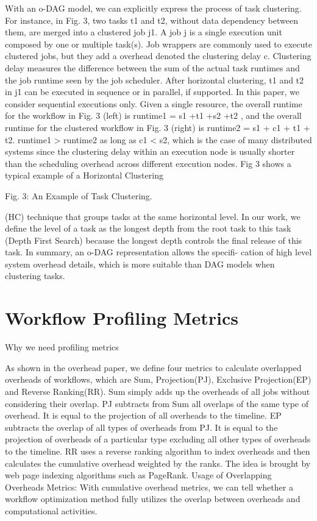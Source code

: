 \documentclass[final,5p,times,twocolumn]{elsarticle}
\begin{document}
With an o-DAG model, we can explicitly express the process of task clustering. For instance, in Fig. 3, two tasks t1 and t2, without data dependency between them, are merged into a clustered job j1. A job j is a single execution unit composed by one or multiple task(s). Job wrappers are commonly used to execute clustered jobs, but they add a overhead denoted the clustering delay c. Clustering delay measures the difference between the sum of the actual task runtimes and the job runtime seen by the job scheduler. After horizontal clustering, t1 and t2 in j1 can be executed in sequence or in parallel, if supported. In this paper, we consider sequential executions only. Given a single resource, the overall runtime for the workflow in Fig. 3 (left) is runtime1 = s1 +t1 +s2 +t2 , and the overall runtime for the clustered workflow in Fig. 3 (right) is runtime2 = s1 + c1 + t1 + t2. runtime1 > runtime2 as long as c1 < s2, which is the case of many distributed systems since the clustering delay within an execution node is usually shorter than the scheduling overhead across different execution nodes.
Fig 3 shows a typical example of a Horizontal Clustering

Fig. 3: An Example of Task Clustering.

(HC) technique that groups tasks at the same horizontal level. In our work, we define the level of a task as the longest depth from the root task to this task (Depth First Search) because the longest depth controls the final release of this task.
In summary, an o-DAG representation allows the specifi- cation of high level system overhead details, which is more suitable than DAG models when clustering tasks.

\section{Workflow Profiling Metrics}

Why we need profiling metrics

As shown in the overhead paper, we define four metrics to calculate overlapped overheads of workflows, which are Sum, Projection(PJ), Exclusive Projection(EP) and Reverse Ranking(RR). Sum simply adds up the overheads of all jobs without considering their overlap. PJ subtracts from Sum all overlaps of the same type of overhead. It is equal to the projection of all overheads to the timeline. EP subtracts the overlap of all types of overheads from PJ. It is equal to the projection of overheads of a particular type excluding all other types of overheads to the timeline. RR uses a reverse ranking algorithm to index overheads and then calculates the cumulative overhead weighted by the ranks. The idea is brought by web page indexing algorithms such as PageRank.
Usage of Overlapping Overheads Metrics:
With cumulative overhead metrics, we can tell whether a workflow optimization method fully utilizes the overlap between overheads and computational activities. 
\end{document}
